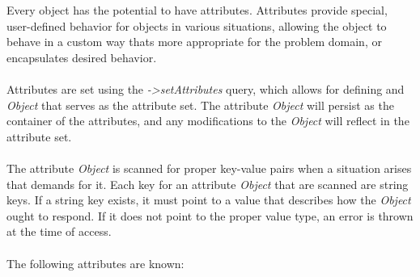 \documentclass[12pt,letterpaper]{report}
\begin{document}
Every object has the potential to have attributes. Attributes provide special, user-defined 
behavior for objects in various situations, allowing the object to behave in a custom 
way thats more appropriate for the problem domain, or encapsulates desired behavior.
\\\\
Attributes are set using the \textit{->setAttributes} query, which allows for defining 
and \textit{Object} that serves as the attribute set. The attribute \textit{Object}
will persist as the container of the attributes, and any modifications to the \textit{Object}
will reflect in the attribute set.
\\\\
The attribute \textit{Object} is scanned for proper key-value pairs when a situation 
arises that demands for it. Each key for an attribute \textit{Object} that are scanned 
are string keys. If a string key exists, it must point to a value that 
describes how the \textit{Object} ought to respond. If it does not point to the proper value type,
an error is thrown at the time of access.
\\\\
The following attributes are known:
\end{document}
